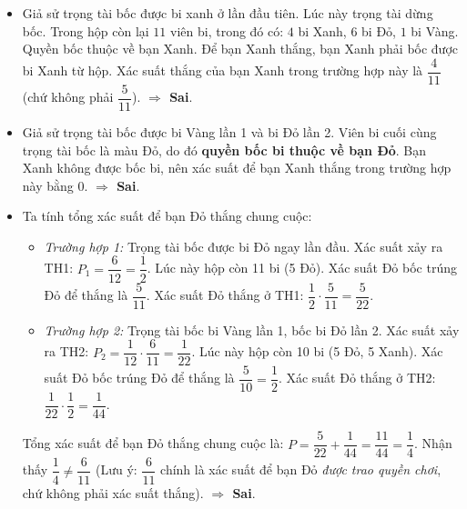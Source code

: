 \documentclass[12pt,a4paper]{article}
\begin{document}
\begin{ex}
{\begin{apdungbox}
\begin{itemize}
    \item[b)] Giả sử trọng tài bốc được bi xanh ở lần đầu tiên. Lúc này trọng tài dừng bốc.
    Trong hộp còn lại $11$ viên bi, trong đó có: $4$ bi Xanh, $6$ bi Đỏ, $1$ bi Vàng.
    Quyền bốc thuộc về bạn Xanh. Để bạn Xanh thắng, bạn Xanh phải bốc được bi Xanh từ hộp.
    Xác suất thắng của bạn Xanh trong trường hợp này là $\dfrac{4}{11}$ (chứ không phải $\dfrac{5}{11}$).
    \textbf{$\Rightarrow$ Sai}.

    \item[c)] Giả sử trọng tài bốc được bi Vàng lần 1 và bi Đỏ lần 2. 
    Viên bi cuối cùng trọng tài bốc là màu Đỏ, do đó \textbf{quyền bốc bi thuộc về bạn Đỏ}.
    Bạn Xanh không được bốc bi, nên xác suất để bạn Xanh thắng trong trường hợp này bằng $0$.
    \textbf{$\Rightarrow$ Sai}.

    \item[d)] Ta tính tổng xác suất để bạn Đỏ thắng chung cuộc:
    \begin{itemize}
        \item \textit{Trường hợp 1:} Trọng tài bốc được bi Đỏ ngay lần đầu.
        Xác suất xảy ra TH1: $P_1 = \dfrac{6}{12} = \dfrac{1}{2}$.
        Lúc này hộp còn 11 bi (5 Đỏ). Xác suất Đỏ bốc trúng Đỏ để thắng là $\dfrac{5}{11}$.
        Xác suất Đỏ thắng ở TH1: $\dfrac{1}{2} \cdot \dfrac{5}{11} = \dfrac{5}{22}$.
        
        \item \textit{Trường hợp 2:} Trọng tài bốc bi Vàng lần 1, bốc bi Đỏ lần 2.
        Xác suất xảy ra TH2: $P_2 = \dfrac{1}{12} \cdot \dfrac{6}{11} = \dfrac{1}{22}$.
        Lúc này hộp còn 10 bi (5 Đỏ, 5 Xanh). Xác suất Đỏ bốc trúng Đỏ để thắng là $\dfrac{5}{10} = \dfrac{1}{2}$.
        Xác suất Đỏ thắng ở TH2: $\dfrac{1}{22} \cdot \dfrac{1}{2} = \dfrac{1}{44}$.
    \end{itemize}
    Tổng xác suất để bạn Đỏ thắng chung cuộc là: $P = \dfrac{5}{22} + \dfrac{1}{44} = \dfrac{11}{44} = \dfrac{1}{4}$.
    Nhận thấy $\dfrac{1}{4} \ne \dfrac{6}{11}$ (Lưu ý: $\dfrac{6}{11}$ chính là xác suất để bạn Đỏ \textit{được trao quyền chơi}, chứ không phải xác suất thắng).
    \textbf{$\Rightarrow$ Sai}.
\end{itemize}

\begin{center}
\end{center}
\end{apdungbox}}
\end{ex}
\end{document}
